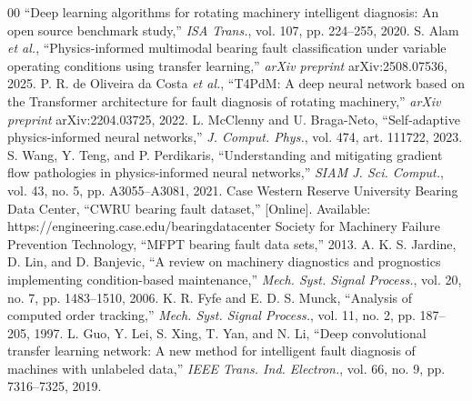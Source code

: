 \documentclass[conference]{IEEEtran}
\begin{document}
\begin{thebibliography}{00}
``Deep learning algorithms for rotating machinery intelligent diagnosis: An
open source benchmark study,'' \textit{ISA Trans.}, vol. 107, pp. 224--255, 2020.
 S. Alam \textit{et al.}, ``Physics-informed multimodal bearing
fault classification under variable operating conditions using transfer
learning,'' \textit{arXiv preprint} arXiv:2508.07536, 2025.
 P. R. de Oliveira da Costa \textit{et al.}, ``T4PdM: A deep
neural network based on the Transformer architecture for fault diagnosis of
rotating machinery,'' \textit{arXiv preprint} arXiv:2204.03725, 2022.
 L. McClenny and U. Braga-Neto, ``Self-adaptive
physics-informed neural networks,'' \textit{J. Comput. Phys.}, vol. 474, art.
111722, 2023.
 S. Wang, Y. Teng, and P. Perdikaris, ``Understanding and
mitigating gradient flow pathologies in physics-informed neural networks,''
\textit{SIAM J. Sci. Comput.}, vol. 43, no. 5, pp. A3055--A3081, 2021.
 Case Western Reserve University Bearing Data Center, ``CWRU
bearing fault dataset,'' [Online]. Available:
https://engineering.case.edu/bearingdatacenter
 Society for Machinery Failure Prevention Technology, ``MFPT
bearing fault data sets,'' 2013.
 A. K. S. Jardine, D. Lin, and D. Banjevic, ``A review on
machinery diagnostics and prognostics implementing condition-based
maintenance,'' \textit{Mech. Syst. Signal Process.}, vol. 20, no. 7, pp.
1483--1510, 2006.
 K. R. Fyfe and E. D. S. Munck, ``Analysis of computed order
tracking,'' \textit{Mech. Syst. Signal Process.}, vol. 11, no. 2, pp. 187--205,
1997.
 L. Guo, Y. Lei, S. Xing, T. Yan, and N. Li, ``Deep
convolutional transfer learning network: A new method for intelligent fault
diagnosis of machines with unlabeled data,'' \textit{IEEE Trans. Ind.
Electron.}, vol. 66, no. 9, pp. 7316--7325, 2019.
\end{thebibliography}
\end{document}

